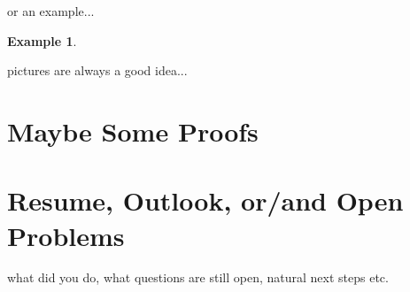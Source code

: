 \documentclass[12pt]{amsart}
\numberwithin{equation}{section}
\theoremstyle{definition}
\newtheorem{example}[thm]{Example}
\numberwithin{thm}{section}
\begin{document}
or an example...
\begin{example}

\end{example}

pictures are always a good idea...



\newpage
\section{Maybe Some Proofs}


\newpage
\section{Resume, Outlook, or/and Open Problems}
\label{Sec:Outlook}


what did you do, what questions are still open, natural next steps etc. 



\newpage


\end{document}
